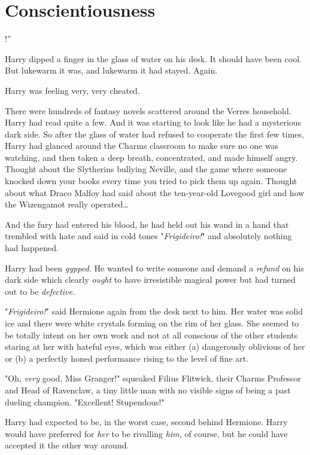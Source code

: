 \chapter{Conscientiousness}

!''

\quad\quad
Harry dipped a finger in the glass of water on his desk. It should have been 
cool. But lukewarm it was, and lukewarm it had stayed. Again.

Harry was feeling very, very cheated.

There were hundreds of fantasy novels scattered around the Verres household. 
Harry had read quite a few. And it was starting to look like he had a 
mysterious dark side. So after the glass of water had refused to cooperate the 
first few times, Harry had glanced around the Charms classroom to make sure no 
one was watching, and then taken a deep breath, concentrated, and made himself 
angry. Thought about the Slytherins bullying Neville, and the game where 
someone knocked down your books every time you tried to pick them up again. 
Thought about what Draco Malfoy had said about the ten-year-old Lovegood girl 
and how the Wizengamot really operated{\ldots}

And the fury had entered his blood, he had held out his wand in a hand that 
trembled with hate and said in cold tones "\emph{Frigideiro!}" and absolutely 
nothing had happened.

Harry had been \emph{gypped.} He wanted to write someone and demand a 
\emph{refund} on his dark side which clearly \emph{ought} to have irresistible 
magical power but had turned out to be \emph{defective.}

"\emph{Frigideiro!}" said Hermione again from the desk next to him. Her water 
was solid ice and there were white crystals forming on the rim of her glass. 
She seemed to be totally intent on her own work and not at all conscious of the 
other students staring at her with hateful eyes, which was either (a) 
dangerously oblivious of her or (b) a perfectly honed performance rising to the 
level of fine art.

"Oh, \emph{very} good, Miss Granger!" squeaked Filius Flitwick, their Charms 
Professor and Head of Ravenclaw, a tiny little man with no visible signs of 
being a past dueling champion. "Excellent! Stupendous!"

Harry had expected to be, in the worst case, second behind Hermione. Harry 
would have preferred for \emph{her} to be rivalling \emph{him,} of course, but 
he could have accepted it the other way around.

